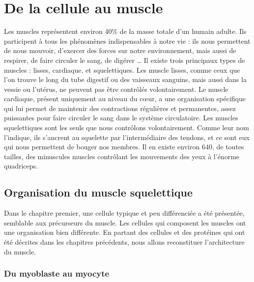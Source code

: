 %
%
%
%
\chapter{De la cellule au muscle}

Les muscles représentent environ 40\% de la masse totale d'un humain adulte. Ils participent à tous les phénomènes indispensables à notre vie : ils nous permettent de nous mouvoir, d'exercer des forces sur notre environnement, mais aussi de respirer, de faire circuler le sang, de digérer \dots 
Il existe trois principaux types de muscles : lisses, cardiaque, et squelettiques. Les muscle lisses, comme ceux que l'on trouve le long du tube digestif ou des vaisseaux sanguins, mais aussi dans la vessie ou l'utérus, ne peuvent pas être contrôlés volontairement. 
Le muscle cardiaque, présent uniquement au niveau du c\oe ur, a une organisation spécifique qui lui permet de maintenir des contractions régulières et permanentes, assez puissantes pour faire circuler le sang dans le système circulatoire. 
Les muscles squelettiques sont les seuls que nous contrôlons volontairement. Comme leur nom l'indique, ils s'ancrent au squelette par l'intermédiaire des tendons, et ce sont eux qui nous permettent de bouger nos membres.  
Il en existe environ 640, de toutes tailles, des minuscules muscles contrôlant les mouvements des yeux à l'énorme quadriceps.

\section{Organisation du muscle squelettique}

Dans le chapitre premier, une cellule typique et peu différenciée a été présentée, semblable aux précurseurs du muscle. Les cellules qui composent les muscles ont une organisation bien différente. 
En partant des cellules et des protéines qui ont été décrites dans les chapitres précédents, nous allons reconstituer l'architecture du muscle. 

\subsection{Du myoblaste au myocyte}

